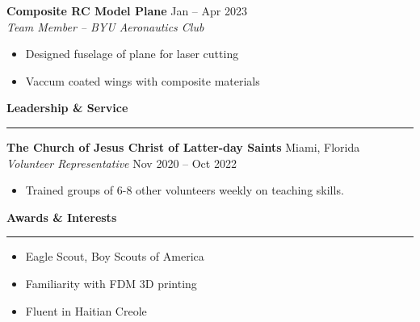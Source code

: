 \documentclass[a4paper,10pt]{article}
\newcommand{\sectionline}{\noindent\rule{\linewidth}{1pt}\vspace{-0.5em}}  %
\begin{document}
\textbf{Composite RC Model Plane} \hfill Jan -- Apr 2023 \\
\emph{Team Member -- BYU Aeronautics Club}
\begin{itemize}[noitemsep, topsep=0pt]
    \item Designed fuselage of plane for laser cutting
    \item Vaccum coated wings with composite materials
\end{itemize}  

\textbf{\large Leadership \& Service} \vspace{-1em}\\
\sectionline

\textbf{The Church of Jesus Christ of Latter-day Saints} \hfill Miami, Florida \\
\emph{Volunteer Representative} \hfill Nov 2020 -- Oct 2022
\begin{itemize}[noitemsep, topsep=0pt]
    \item Trained groups of 6-8 other volunteers weekly on teaching skills.
\end{itemize}

\textbf{\large Awards \& Interests} \vspace{-1em}\\
\sectionline

\begin{itemize}[noitemsep, topsep=0pt]
    \item Eagle Scout, Boy Scouts of America
    \item Familiarity with FDM 3D printing
    \item Fluent in Haitian Creole
\end{itemize}
\end{document}
